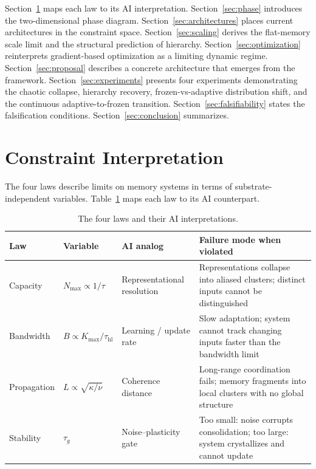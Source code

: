 \documentclass[12pt]{article}
\begin{document}
Section~\ref{sec:constraints} maps each law to its AI interpretation. Section~\ref{sec:phase} introduces the two-dimensional phase diagram. Section~\ref{sec:architectures} places current architectures in the constraint space. Section~\ref{sec:scaling} derives the flat-memory scale limit and the structural prediction of hierarchy. Section~\ref{sec:optimization} reinterprets gradient-based optimization as a limiting dynamic regime. Section~\ref{sec:proposal} describes a concrete architecture that emerges from the framework. Section~\ref{sec:experiments} presents four experiments demonstrating the chaotic collapse, hierarchy recovery, frozen-vs-adaptive distribution shift, and the continuous adaptive-to-frozen transition. Section~\ref{sec:falsifiability} states the falsification conditions. Section~\ref{sec:conclusion} summarizes.

\section{Constraint Interpretation}
\label{sec:constraints}

The four laws describe limits on memory systems in terms of substrate-independent variables. Table~\ref{tab:constraints} maps each law to its AI counterpart.

\begin{table}[h]
\centering
\caption{The four laws and their AI interpretations.}
\label{tab:constraints}
\begin{tabular}{lllp{5.5cm}}
\toprule
\textbf{Law} & \textbf{Variable} & \textbf{AI analog} & \textbf{Failure mode when violated} \\
\midrule
Capacity & $N_{\max} \propto 1/\tau$ & Representational resolution & Representations collapse into aliased clusters; distinct inputs cannot be distinguished \\
Bandwidth & $B \propto K_{\max}/\tau_{\text{hl}}$ & Learning / update rate & Slow adaptation; system cannot track changing inputs faster than the bandwidth limit \\
Propagation & $L \propto \sqrt{\kappa/\nu}$ & Coherence distance & Long-range coordination fails; memory fragments into local clusters with no global structure \\
Stability & $\tau_g$ & Noise--plasticity gate & Too small: noise corrupts consolidation; too large: system crystallizes and cannot update \\
\bottomrule
\end{tabular}
\end{table}
\end{document}
